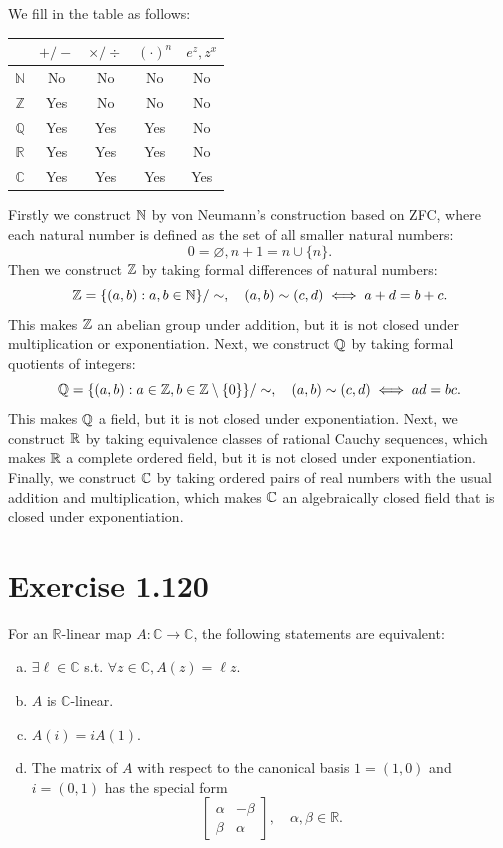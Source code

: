 \documentclass{article}
\begin{document}
\begin{solution}
  We fill in the table as follows:
  \begin{center}
    \begin{tabular}{|c|c|c|c|c|}
      \hline
      & $+/-$ & $\times/\div$ & $(\cdot)^n$ & $e^z, z^x$ \\ \hline
      $\mathbb{N}$ & No & No & No & No \\ \hline
      $\mathbb{Z}$ & Yes & No & No & No \\ \hline
      $\mathbb{Q}$ & Yes & Yes & Yes & No \\ \hline
      $\mathbb{R}$ & Yes & Yes & Yes & No \\ \hline
      $\mathbb{C}$ & Yes & Yes & Yes & Yes \\ \hline
    \end{tabular}
  \end{center}

  Firstly we construct $\mathbb{N}$ by von Neumann's construction based on
  ZFC, where each
  natural number is defined as the set of all smaller natural numbers:
  \[
    0 = \varnothing, n + 1 = n \cup \{n\}.
  \]
  Then we construct $\mathbb{Z}$ by taking formal differences of natural numbers:
  \[
    \mathbb{Z} = \{(a, b) : a, b \in \mathbb{N}\} / \sim, \quad (a, b) \sim (c, d)
    \iff a + d = b + c.
  \]
  This makes $\mathbb{Z}$ an abelian group under addition, but it is not closed under
  multiplication or exponentiation. Next, we construct $\mathbb{Q}$ by taking formal
  quotients of integers:
  \[
    \mathbb{Q} = \{(a, b) : a \in \mathbb{Z}, b \in \mathbb{Z} \setminus \{0\}\} / \sim,
    \quad (a, b) \sim (c, d) \iff ad = bc.
  \]
  This makes $\mathbb{Q}$ a field, but it is not closed under exponentiation.
  Next, we construct $\mathbb{R}$ by taking equivalence classes of rational
  Cauchy sequences, which makes $\mathbb{R}$ a complete ordered field, but it
  is not closed under exponentiation. Finally, we construct $\mathbb{C}$ by
  taking ordered pairs of real numbers with the usual addition and
  multiplication, which makes $\mathbb{C}$ an algebraically closed field that is
  closed under exponentiation.

\end{solution}

\section{Exercise 1.120}
For an $\mathbb{R}$-linear map $A : \mathbb{C} \to \mathbb{C}$, the
following statements are equivalent:
\begin{enumerate}[(a)]
  \item $\exists \ell \in \mathbb{C}$ s.t. $\forall z \in \mathbb{C},
    A(z) = \ell z$.
  \item $A$ is $\mathbb{C}$-linear.
  \item $A(i) = iA(1)$.
  \item The matrix of $A$ with respect to the canonical basis $1 =
    (1, 0)$ and $i = (0, 1)$ has the special form
    \[
      \begin{bmatrix}
        \alpha & -\beta \\
        \beta & \alpha
      \end{bmatrix}, \quad \alpha, \beta \in \mathbb{R}.
    \]
\end{enumerate}
\end{document}
